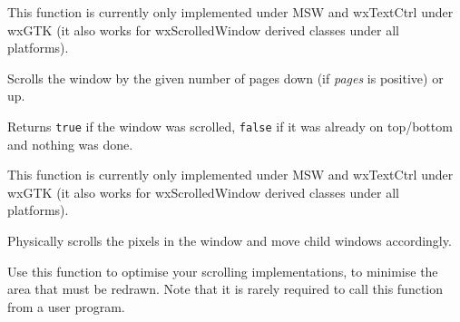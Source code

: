 
This function is currently only implemented under MSW and wxTextCtrl under
wxGTK (it also works for wxScrolledWindow derived classes under all
platforms).



\label{wxwindowscrollpages}


Scrolls the window by the given number of pages down (if {\it pages} is
positive) or up.


Returns {\tt true} if the window was scrolled, {\tt false} if it was already
on top/bottom and nothing was done.


This function is currently only implemented under MSW and wxTextCtrl under
wxGTK (it also works for wxScrolledWindow derived classes under all
platforms).



\label{wxwindowscrollwindow}


Physically scrolls the pixels in the window and move child windows accordingly.






Use this function to optimise your scrolling implementations, to minimise the area that must be
redrawn. Note that it is rarely required to call this function from a user program.

\label{wxwindowsetacceleratortable}

